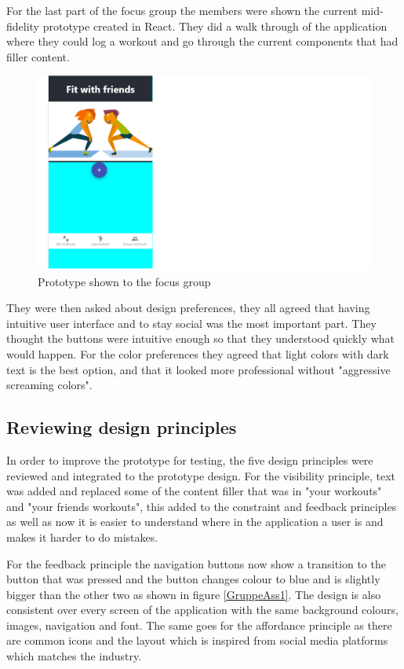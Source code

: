 For the last part of the focus group the members were shown the current mid-fidelity prototype created in React. They did a walk through of the application where they could log a workout and go through the current components that had filler content.
\begin{figure}[H]
    \centering
    \includegraphics[scale=0.6]{figures/appenSaaLangt2.png}
    \caption{Prototype shown to the focus group}
    \label{ReactProt}
\end{figure}

They were then asked about design preferences, they all agreed that having intuitive user interface and to stay social was the most important part. They thought the buttons were intuitive enough so that they understood quickly what would happen.
For the color preferences they agreed that light colors with dark text is the best option, and that it looked more professional without "aggressive screaming colors".
\subsection{Reviewing design principles}
In order to improve the prototype for testing, the five design principles were reviewed and integrated to the prototype design. For the visibility principle, text was added and replaced some of the content filler that was in "your workouts" and "your friends workouts", this added to the constraint and feedback principles as well as now it is easier to understand where in the application a user is and makes it harder to do mistakes.

For the feedback principle the navigation buttons now show a transition to the button that was pressed and the button changes colour to blue and is slightly bigger than the other two as shown in figure \ref{GruppeAss1}. The design is also consistent over every screen of the application with the same background colours, images, navigation and font. The same goes for the affordance principle as there are common icons and the layout which is inspired from social media platforms which matches the industry.
